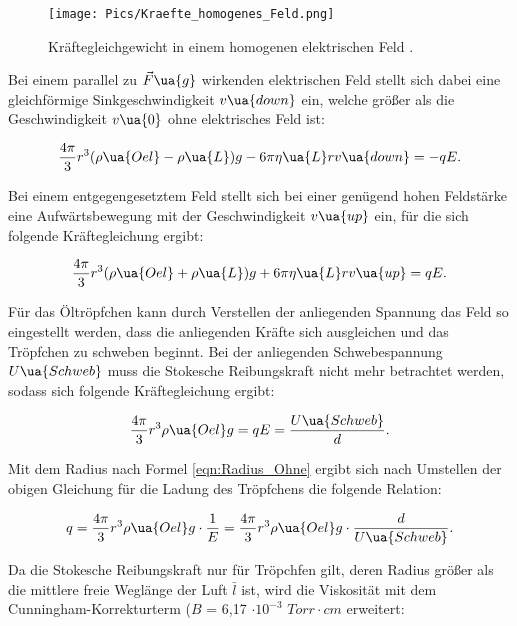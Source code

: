 \begin{figure}
  \texttt{[image: Pics/Kraefte\_homogenes\_Feld.png]}
  \caption{Kräftegleichgewicht in einem homogenen elektrischen Feld \cite{anleitung01}.}
  \label{fig:Kräftegleichgewicht}
\end{figure}

Bei einem parallel zu $\vec{F}\ua{g}$ wirkenden elektrischen Feld stellt sich dabei
eine gleichförmige Sinkgeschwindigkeit $v\ua{down}$ ein, welche größer als die
Geschwindigkeit $v\ua{0}$ ohne elektrisches Feld ist:

\begin{equation}
  \frac{4\pi}{3}r^3(\rho\ua{Oel}-\rho\ua{L})g - 6\pi\eta\ua{L}rv\ua{down} = -qE.
  \label{eqn:Kräftegleichung_parallel}
\end{equation}

Bei einem entgegengesetztem Feld stellt sich bei einer genügend hohen Feldstärke
eine Aufwärtsbewegung mit der Geschwindigkeit $v\ua{up}$ ein, für die sich
folgende Kräftegleichung ergibt:

\begin{equation}
  \frac{4\pi}{3}r^3(\rho\ua{Oel}+\rho\ua{L})g + 6\pi\eta\ua{L}rv\ua{up} = qE.
  \label{eqn:Kräftegleichung_entgegen}
\end{equation}

Für das Öltröpfchen kann durch Verstellen der anliegenden Spannung das Feld so
eingestellt werden, dass die anliegenden Kräfte sich ausgleichen und das
Tröpfchen zu schweben beginnt. Bei der anliegenden Schwebespannung $U\ua{Schweb}$
muss die Stokesche Reibungskraft nicht mehr betrachtet werden, sodass sich
folgende Kräftegleichung ergibt:

\begin{align}
  \frac{4\pi}{3}r^3\rho\ua{Oel}g = qE = \frac{U\ua{Schweb}}{d}.
  \label{eqn:Kräftegleichung_Schwebung}
\end{align}

Mit dem Radius nach Formel \eqref{eqn:Radius_Ohne} ergibt sich nach Umstellen
der obigen Gleichung für die Ladung des Tröpfchens die folgende Relation:

\begin{align}
  \label{eqn:Ladung_bestimmt}
  q = \frac{4\pi}{3}r^3\rho\ua{Oel}g \cdot \frac{1}{E} = \frac{4\pi}{3}r^3\rho\ua{Oel}g \cdot \frac{d}{U\ua{Schweb}}.
\end{align}

Da die Stokesche Reibungskraft nur für Tröpchfen gilt, deren Radius größer als
die mittlere freie Weglänge der Luft $\bar{l}$ ist, wird die Viskosität mit dem
Cunningham-Korrekturterm ($B$ = 6,17 $\cdot 10^{-3}$ $Torr\cdot cm$ erweitert:

